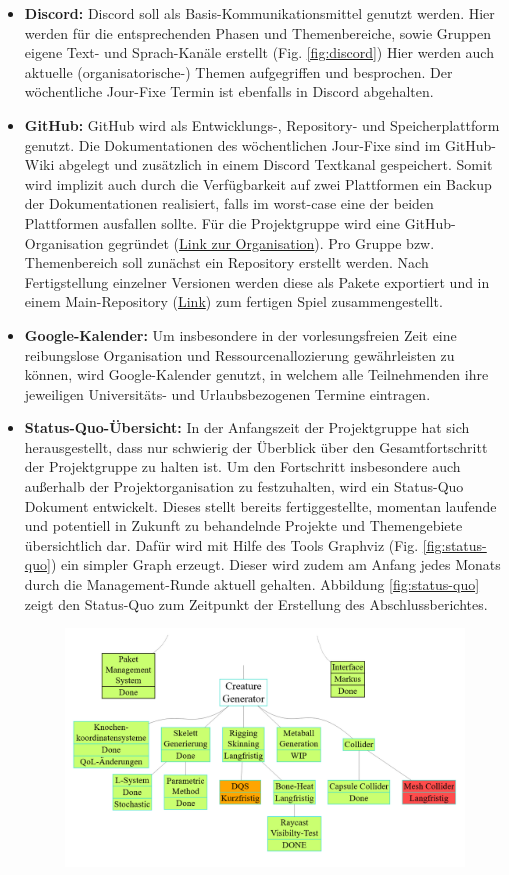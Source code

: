 \begin{itemize}
	\item \textbf{Discord: } Discord soll als Basis-Kommunikationsmittel genutzt werden. Hier werden für die entsprechenden Phasen und Themenbereiche, sowie Gruppen eigene Text- und Sprach-Kanäle erstellt (Fig. \ref{fig:discord}) Hier werden auch aktuelle (organisatorische-) Themen aufgegriffen und besprochen. Der wöchentliche Jour-Fixe Termin ist ebenfalls in Discord abgehalten. 
	\item \textbf{GitHub: } GitHub wird als Entwicklungs-, Repository- und Speicherplattform genutzt. Die Dokumentationen des wöchentlichen Jour-Fixe sind im GitHub-Wiki abgelegt und zusätzlich in einem Discord Textkanal gespeichert. Somit wird implizit auch durch die Verfügbarkeit auf zwei Plattformen ein Backup der Dokumentationen realisiert, falls im worst-case eine der beiden Plattformen ausfallen sollte. Für die Projektgruppe wird eine GitHub-Organisation gegründet (\href{https://github.com/PG649-3D-RPG}{Link zur Organisation}). Pro Gruppe bzw. Themenbereich soll zunächst ein Repository erstellt werden. Nach Fertigstellung einzelner Versionen werden diese als Pakete exportiert und in einem Main-Repository (\href{https://github.com/PG649-3D-RPG/Horror-Survival-RPG}{Link}) zum fertigen Spiel zusammengestellt.
	\item \textbf{Google-Kalender: } Um insbesondere in der vorlesungsfreien Zeit eine reibungslose Organisation und Ressourcenallozierung gewährleisten zu können, wird Google-Kalender genutzt, in welchem alle Teilnehmenden ihre jeweiligen Universitäts- und Urlaubsbezogenen Termine eintragen.
	\item \textbf{Status-Quo-Übersicht: } In der Anfangszeit der Projektgruppe hat sich herausgestellt, dass nur schwierig der Überblick über den Gesamtfortschritt der Projektgruppe zu halten ist. Um den Fortschritt insbesondere auch außerhalb der Projektorganisation zu festzuhalten, wird ein Status-Quo Dokument entwickelt. Dieses stellt bereits fertiggestellte, momentan laufende und potentiell in Zukunft zu behandelnde Projekte und Themengebiete übersichtlich dar. Dafür wird mit Hilfe des Tools Graphviz (Fig. \ref{fig:status-quo}) ein simpler Graph erzeugt. Dieser wird zudem am Anfang jedes Monats durch die Management-Runde aktuell gehalten. Abbildung \ref{fig:status-quo} zeigt den Status-Quo zum Zeitpunkt der Erstellung des Abschlussberichtes.
	\begin{figure}
		\centering
		\includegraphics[width=0.7\linewidth]{resources/img/Graphviz_fin_CG.png}

\end{figure}
\end{itemize}

